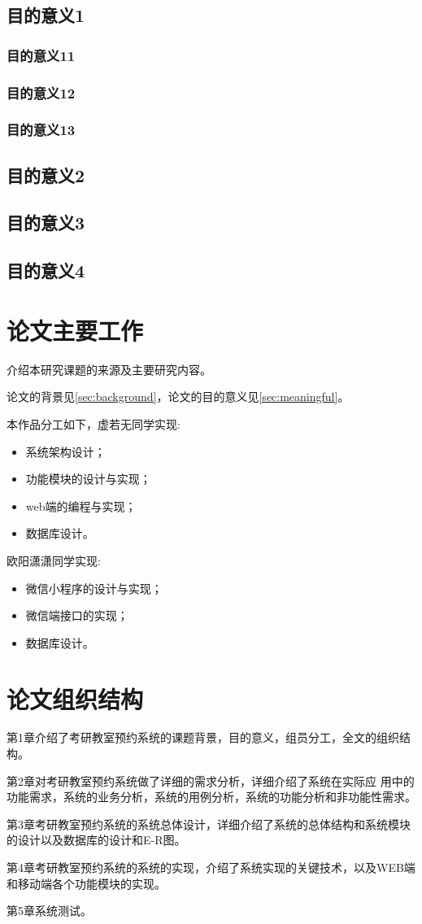 \subsection{目的意义1}
\subsubsection{目的意义11}
\subsubsection{目的意义12}
\subsubsection{目的意义13}
\subsection{目的意义2}
\subsection{目的意义3}
\subsection{目的意义4}

\section{论文主要工作}
介绍本研究课题的来源及主要研究内容。

论文的背景见\ref{sec:background}，论文的目的意义见\ref{sec:meaningful}。

本作品分工如下，虚若无同学实现:
\begin{itemize}
	\item 系统架构设计；
	\item 功能模块的设计与实现；
	\item web端的编程与实现；
	\item 数据库设计。
\end{itemize}

欧阳潇潇同学实现:
\begin{itemize}
	\item 微信小程序的设计与实现；
	\item 微信端接口的实现；
	\item 数据库设计。
\end{itemize}

\section{论文组织结构}

第1章介绍了考研教室预约系统的课题背景，目的意义，组员分工，全文的组织结构。

第2章对考研教室预约系统做了详细的需求分析，详细介绍了系统在实际应
用中的功能需求，系统的业务分析，系统的用例分析，系统的功能分析和非功能性需求。
 
第3章考研教室预约系统的系统总体设计，详细介绍了系统的总体结构和系统模块的设计以及数据库的设计和E-R图。

第4章考研教室预约系统的系统的实现，介绍了系统实现的关键技术，以及WEB端和移动端各个功能模块的实现。

第5章系统测试。